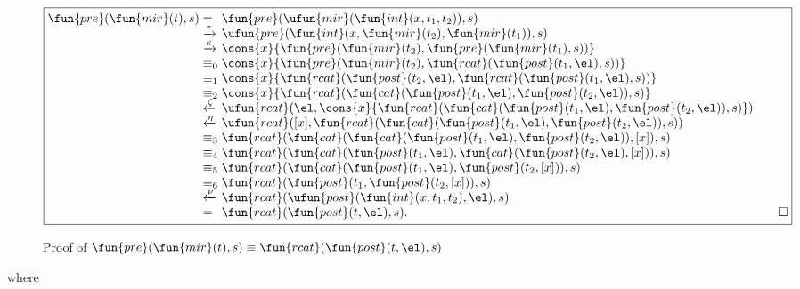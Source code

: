\begin{figure}
\begin{equation*}
\boxed{
\begin{array}{@{}r@{\;}l@{\;}l@{\qquad}r@{}}
\fun{pre}(\fun{mir}(t),s)
& = & \fun{pre}(\ufun{mir}(\fun{int}(x,t_1,t_2)),s)\\
& \xrightarrow{\smash{\tau}}
& \ufun{pre}(\fun{int}(x,\fun{mir}(t_2),\fun{mir}(t_1)),s)\\
& \xrightarrow{\smash{\kappa}}
& \cons{x}{\fun{pre}(\fun{mir}(t_2),\fun{pre}(\fun{mir}(t_1),s))}\\
& \equiv_0
& \cons{x}{\fun{pre}(\fun{mir}(t_2),
           \fun{rcat}(\fun{post}(t_1,\el),s))}\\
& \equiv_1
& \cons{x}{\fun{rcat}(\fun{post}(t_2,\el),
           \fun{rcat}(\fun{post}(t_1,\el),s))}\\
& \equiv_2
& \cons{x}{\fun{rcat}(\fun{cat}(\fun{post}(t_1,\el), \fun{post}(t_2,\el)), s)}\\
& \xleftarrow{\smash{\zeta}}
& \ufun{rcat}(\el,\cons{x}{\fun{rcat}(\fun{cat}(\fun{post}(t_1,\el),
                                       \fun{post}(t_2,\el)), s)})\\
& \xleftarrow{\smash{\eta}}
& \ufun{rcat}([x],\fun{rcat}(\fun{cat}(\fun{post}(t_1,\el), \fun{post}(t_2,\el)), s))\\
& \equiv_3
& \fun{rcat}(\fun{cat}(\fun{cat}(\fun{post}(t_1,\el), \fun{post}(t_2,\el)), [x]), s)\\
& \equiv_4
& \fun{rcat}(\fun{cat}(\fun{post}(t_1,\el),
                       \fun{cat}(\fun{post}(t_2,\el),
                                 [x])),
             s)\\
& \equiv_5
& \fun{rcat}(\fun{cat}(\fun{post}(t_1,\el),
                       \fun{post}(t_2,[x])),
             s)\\
& \equiv_6
& \fun{rcat}(\fun{post}(t_1,\fun{post}(t_2,[x])),s)\\
& \xleftarrow{\smash{\nu}}
& \fun{rcat}(\ufun{post}(\fun{int}(x,t_1,t_2),\el),s)\\
& =
& \fun{rcat}(\fun{post}(t,\el),s).
& \hfill\Box
\end{array}
}
\end{equation*}
\caption{Proof of \(\fun{pre}(\fun{mir}(t),s) \equiv
  \fun{rcat}(\fun{post}(t,\el),s)\)}
\label{fig:premir}
\end{figure}
where
